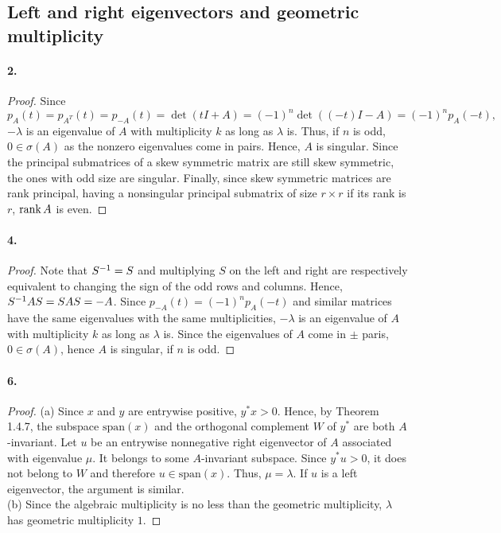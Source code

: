 
\subsection{Left and right eigenvectors and geometric multiplicity}
  \paragraph{2.}
  \begin{proof}
    Since
    \[
      p_A(t)=p_{A^T}(t)=p_{-A}(t)=\det(tI+A)=(-1)^n\det((-t)I-A)=(-1)^np_A(-t),
    \]
    $-\lambda$ is an eigenvalue of $A$ with multiplicity $k$ as long as 
    $\lambda$ is. Thus, if $n$ is odd, $0\in\sigma(A)$ as the nonzero eigenvalues 
    come in pairs. Hence, $A$ is singular. Since the principal submatrices of a 
    skew symmetric matrix are still skew symmetric, the ones with odd size are
    singular. Finally, since skew symmetric matrices are rank principal, having
    a nonsingular principal submatrix of size $r\times r$ if its rank is $r$, 
    $\operatorname{rank} A$ is even.
  \end{proof}

  \paragraph{4.}
  \begin{proof}
    Note that $S^{-1} = S$ and multiplying $S$ on the left and right are 
    respectively equivalent to changing the sign of the odd rows and columns.
    Hence, $S^{-1} AS = SAS = -A$. Since $p_{-A}(t)=(-1)^np_A(-t)$ and similar
    matrices have the same eigenvalues with the same multiplicities, $-\lambda$
    is an eigenvalue of $A$ with multiplicity $k$ as long as $\lambda$ is. Since
    the eigenvalues of $A$ come in $\pm$ paris, $0\in\sigma(A)$, hence $A$ is 
    singular, if $n$ is odd.
  \end{proof}

  \paragraph{6.}
  \begin{proof}
    (a) Since $x$ and $y$ are entrywise positive, $y^*x>0$. Hence, by Theorem 
    1.4.7, the subspace $\text{span}(x)$ and the orthogonal complement $W$ of 
    $y^*$ are both $A$-invariant. Let $u$ be an entrywise nonnegative right 
    eigenvector of $A$ associated with eigenvalue $\mu$. It belongs to some 
    $A$-invariant subspace. Since $y^*u>0$, it does not belong to $W$ and 
    therefore $u \in\text{span}(x)$. Thus, $\mu = \lambda$. If $u$ is a left 
    eigenvector, the argument is similar. \\
    (b) Since the algebraic multiplicity is no less than the geometric 
    multiplicity, $\lambda$ has geometric multiplicity $1$.
  \end{proof}

